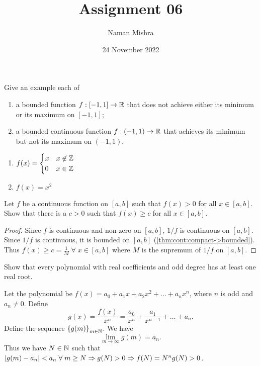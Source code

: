 \documentclass[12pt]{article}
\title{Assignment 06}
\author{Naman Mishra}
\date{24 November 2022}
\begin{document}
\maketitle

\begin{problem}
    Give an example each of
    \begin{enumerate}[label=(\alph*)]
        \item a bounded function $f : [-1, 1] \to \mathbb{R}$ that does not achieve either its minimum or its maximum on $[-1, 1]$;
        \item a bounded continuous function $f : (-1, 1) \to \mathbb{R}$ that achieves its minimum but not its maximum on $(-1, 1)$.
    \end{enumerate}
\end{problem}
\begin{enumerate}[label=(\alph*)]
    \item $f(x) =
        \begin{cases}
            x & x \not\in \mathbb{Z} \\
            0 & x \in \mathbb{Z}
        \end{cases}$
    \item $f(x) = x^{2}$ \qedhere
\end{enumerate}

\begin{problem}
    Let $f$ be a continuous function on $[a, b]$ such that $f(x) > 0$ for all $x \in [a, b]$.
    Show that there is a $c > 0$ such that $f(x) \geq c$ for all $x \in [a, b]$.
\end{problem}
\begin{proof}
    Since $f$ is continuous and non-zero on $[a, b]$, $1 / f$ is continuous on $[a, b]$.
    Since $1 / f$ is continuous, it is bounded on $[a, b]$ (\cref{thm:cont:compact->bounded}).
    Thus $f(x) \geq c = \frac{1}{M} \;\forall\; x \in [a, b]$ where $M$ is the supremum of $1 / f$ on $[a, b]$.
\end{proof}

\begin{problem}
    Show that every polynomial with real coefficients and odd degree has at least one real root.
\end{problem}
Let the polynomial be $f(x) = a_{0} + a_{1}x + a_{2}x^{2} + \dots + a_{n}x^{n}$, where $n$ is odd and $a_{n} \neq 0$.
Define \[
    g(x) = \frac{f(x)}{x^{n}} = \frac{a_{0}}{x^{n}} + \frac{a_{1}}{x^{n-1}} + \dots + a_{n}.
\] Define the sequence $\set{g(m)}_{m \in \N}$.
We have \[
    \lim_{m \to \infty} g(m) = a_{n}.
\] Thus we have $N \in \mathbb{N}$ such that $\abs{g(m) - a_{n}} < a_{n} \;\forall\; m \geq N \implies g(N) > 0 \implies f(N) = N^{n} g(N) > 0$. 
\end{document}
